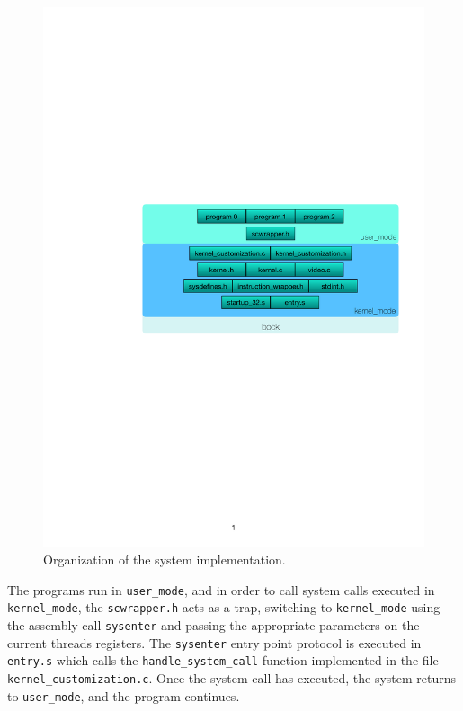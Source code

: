 \begin{figure}[H]
    \centering
    \includegraphics[width=\linewidth]{fig/system_organization.pdf}
    \caption{Organization of the system implementation.}
    \label{fig:sys_org}
\end{figure}

The programs run in \texttt{user\_mode}, and in order to call system calls executed in \texttt{kernel\_mode}, the \texttt{scwrapper.h} acts as a trap, switching to \texttt{kernel\_mode} using the assembly call \texttt{sysenter} and passing the appropriate parameters on the current threads registers. The \texttt{sysenter} entry point protocol is executed in \texttt{entry.s} which calls the \texttt{handle\_system\_call} function implemented in the file \texttt{kernel\_customization.c}. Once the system call has executed, the system returns to \texttt{user\_mode}, and the program continues. 



